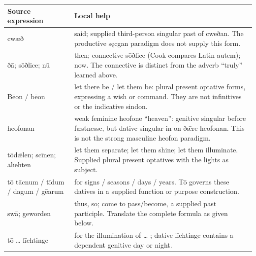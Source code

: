 \par\begingroup
\fontsize{10.5}{13.2}\selectfont
\setlength{\LTleft}{0pt}\setlength{\LTright}{\fill}
\noindent
\begin{tabular}{@{}>{\raggedright\arraybackslash}p{29.38mm}>{\raggedright\arraybackslash}p{91.81mm}@{}}
\toprule
\textbf{Source expression} & \textbf{Local help} \\
\midrule
cwæð & said; supplied third-person singular past of cweðan. The productive sęcgan paradigm does not supply this form. \\
ðā; sōðlice; nū & then; connective sōðlice (Cook compares Latin autem); now. The connective is distinct from the adverb “truly” learned above. \\
Bēon /\allowbreak{} bēon & let there be /\allowbreak{} let them be: plural present optative forms, expressing a wish or command. They are not infinitives or the indicative sindon. \\
heofonan & weak feminine heofone “heaven”: genitive singular before fæstnesse, but dative singular in on ðǣre heofonan. This is not the strong masculine heofon paradigm. \\
tōdǣlen; scīnen; ālīehten & let them separate; let them shine; let them illuminate. Supplied plural present optatives with the lights as subject. \\
tō tācnum /\allowbreak{} tīdum /\allowbreak{} dagum /\allowbreak{} gēarum & for signs /\allowbreak{} seasons /\allowbreak{} days /\allowbreak{} years. Tō governs these datives in a supplied function or purpose construction. \\
swā; geworden & thus, so; come to pass/\allowbreak{}become, a supplied past participle. Translate the complete formula as given below. \\
tō … līehtinge & for the illumination of … ; dative līehtinge contains a dependent genitive day or night. \\

\end{tabular}
